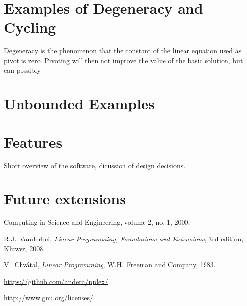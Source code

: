 \documentclass[ukenglish]{nik}
\begin{document}
\section{Examples of Degeneracy and Cycling}
Degeneracy is the phenomenon that the constant of the linear equation used as pivot
is zero. Pivoting will then not improve the value of the basic solution, but can possibly

\begin{alltt}

\end{alltt}

\section{Unbounded Examples}


\section{Features}
Short overview of the software, dicussion of design decisions.

\section{Future extensions}





\begin{thebibliography}{99}
 Computing in Science and Engineering, volume 2, no. 1, 2000.

 R.J.~Vanderbei, 
\emph{Linear Programming, Foundations and Extensions},
3rd edition, Kluwer, 2008.

 V.~Chv\'atal,
\emph{Linear Programming},
W.H.~Freeman and Company, 1983.

\url{https://github.com/andern/pplex/}

\url{http://www.gnu.org/licenses/}

\end{thebibliography}
\end{document}
